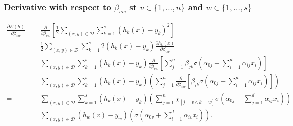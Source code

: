 \begin{frame}
  \frametitle{Derivative with respect to $\beta_{v w}$ st $v \in \{1, \ldots, n\}$ and $w \in \{1, \ldots, s\}$}
{\tiny
    \begin{align} \label{eq:parcial_beta}
        \frac{\partial E(h)}{\partial \beta_{v w}} 
        = &
        \frac{\partial}{\partial \beta_{v w}}
        \left[
            \frac{1}{2}
            \sum_{(x,y) \in \mathcal{D}}
            \sum_{k = 1}^s 
            \left(h_k(x) - y_k \right)^2
        \right]
        \\ %
        = &
        \frac{1}{2}
        \sum_{(x,y) \in \mathcal{D}}
        \sum_{k = 1}^s 
        2 \left(h_k(x) - y_k \right)
        \frac{\partial h_k(x)}{\partial \beta_{v w}} 
        \\ 
        = & %
        \sum_{(x,y) \in \mathcal{D}}
        \sum_{k = 1}^s 
        \left(h_k(x) - y_k \right)
        \frac{\partial}{\partial \beta_{v w}} 
        \left[
            \sum_{j = 1}^n 
                \beta_{j k}
                \sigma
                \left(  
                    \alpha_{0 j} +
                    \sum_{i=1}^d \alpha_{i j}x_i
                \right)
        \right] 
        \\ 
        = & %
        \sum_{(x,y) \in \mathcal{D}}
        \sum_{k = 1}^s 
        \left(h_k(x) - y_k \right)
        \left(
            \sum_{j = 1}^n 
            \frac{\partial}{\partial \beta_{v w}} 
            \left[
                \beta_{j k}
                \sigma
                \left(  
                    \alpha_{0 j} +
                    \sum_{i=1}^d \alpha_{i j}x_i
                \right)
            \right]
        \right) 
        \\ 
        = & %
        \sum_{(x,y) \in \mathcal{D}}
        \sum_{k = 1}^s 
        \left(h_k(x) - y_k \right)
        \left(
            \sum_{j = 1}^n 
                \chi_{[j = v \wedge k = w]}
                \sigma
                \left(  
                    \alpha_{0 j} +
                    \sum_{j=1}^d \alpha_{i j}x_i
                \right)
        \right)
        \\ 
        = & %
        \sum_{(x,y) \in \mathcal{D}}
        \left(h_w(x) - y_w \right)
        \left(
            \sigma
            \left(  
                \alpha_{0 v} +
                \sum_{i=1}^d \alpha_{i v}x_i
            \right)
        \right).
    \end{align}
  }
\end{frame}

